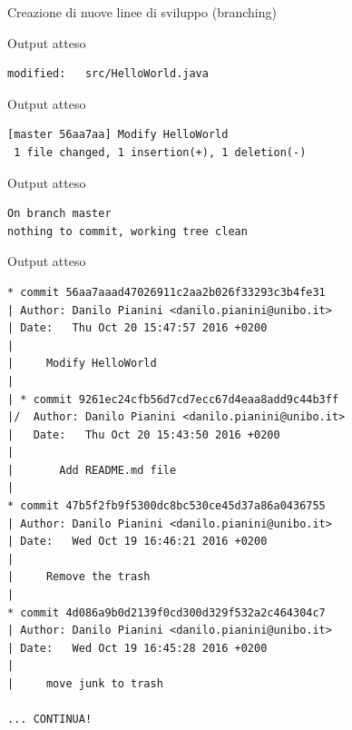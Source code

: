 \documentclass[presentation]{beamer}
\begin{document}
\begin{frame}{Creazione di nuove linee di sviluppo (branching)}
\begin{block}{Output atteso}
\begin{Verbatim}[fontsize=\scriptsize]
        modified:   src/HelloWorld.java

		\end{Verbatim}
	\end{block}
	\begin{block}{Output atteso}
		\begin{Verbatim}[fontsize=\scriptsize]
[master 56aa7aa] Modify HelloWorld
 1 file changed, 1 insertion(+), 1 deletion(-)
		\end{Verbatim}
	\end{block}
	\begin{block}{Output atteso}
		\begin{Verbatim}[fontsize=\scriptsize]
On branch master
nothing to commit, working tree clean
		\end{Verbatim}
	\end{block}
	\begin{block}{Output atteso}
		\begin{Verbatim}[fontsize=\tiny]
* commit 56aa7aaad47026911c2aa2b026f33293c3b4fe31
| Author: Danilo Pianini <danilo.pianini@unibo.it>
| Date:   Thu Oct 20 15:47:57 2016 +0200
| 
|     Modify HelloWorld
|    
| * commit 9261ec24cfb56d7cd7ecc67d4eaa8add9c44b3ff
|/  Author: Danilo Pianini <danilo.pianini@unibo.it>
|   Date:   Thu Oct 20 15:43:50 2016 +0200
|   
|       Add README.md file
|  
* commit 47b5f2fb9f5300dc8bc530ce45d37a86a0436755
| Author: Danilo Pianini <danilo.pianini@unibo.it>
| Date:   Wed Oct 19 16:46:21 2016 +0200
| 
|     Remove the trash
|  
* commit 4d086a9b0d2139f0cd300d329f532a2c464304c7
| Author: Danilo Pianini <danilo.pianini@unibo.it>
| Date:   Wed Oct 19 16:45:28 2016 +0200
| 
|     move junk to trash

... CONTINUA!
		\end{Verbatim}
	\end{block}
\end{frame}
\end{document}
